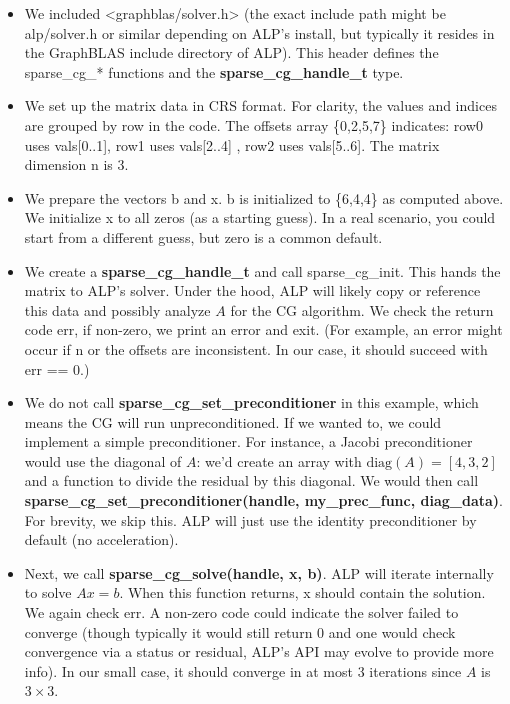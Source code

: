 \begin{itemize}

    \item We included <graphblas/solver.h> (the exact include path might be alp/solver.h or similar depending on ALP’s install, but typically it resides in the GraphBLAS include directory of ALP). This header defines the sparse\_cg\_* functions and the \textbf{sparse\_cg\_handle\_t} type.
    
    \item We set up the matrix data in CRS format. For clarity, the values and indices are grouped by row in the code. The offsets array \{0,2,5,7\} indicates: row0 uses vals[0..1], row1 uses vals[2..4] , row2 uses vals[5..6]. The matrix dimension n is 3.
    
    \item We prepare the vectors b and x. b is initialized to \{6,4,4\} as computed above. We initialize x to all zeros (as a starting guess). In a real scenario, you could start from a different guess, but zero is a common default.
    
    \item We create a \textbf{sparse\_cg\_handle\_t} and call {sparse\_cg\_init}. This hands the matrix to ALP’s solver. Under the hood, ALP will likely copy or reference this data and possibly analyze $A$ for the CG algorithm. We check the return code err, if non-zero, we print an error and exit. (For example, an error might occur if n or the offsets are inconsistent. In our case, it should succeed with err == 0.)
    
    \item We do not call \textbf{sparse\_cg\_set\_preconditioner} in this example, which means the CG will run unpreconditioned. If we wanted to, we could implement a simple preconditioner. For instance, a Jacobi preconditioner would use the diagonal of $A$: we’d create an array with $\text{diag}(A) = [4,3,2]$ and a function to divide the residual by this diagonal. We would then call \textbf{sparse\_cg\_set\_preconditioner(handle, my\_prec\_func, diag\_data)}. For brevity, we skip this. ALP will just use the identity preconditioner by default (no acceleration).
    
    \item Next, we call \textbf{sparse\_cg\_solve(handle, x, b)}. ALP will iterate internally to solve $Ax=b$. When this function returns, x should contain the solution. We again check err. A non-zero code could indicate the solver failed to converge (though typically it would still return 0 and one would check convergence via a status or residual, ALP’s API may evolve to provide more info). In our small case, it should converge in at most 3 iterations since $A$ is $3\times3$.
    

\end{itemize}
